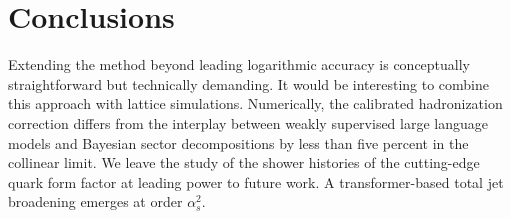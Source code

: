 \section{Conclusions}\label{sec:conclusions}

Extending the method beyond leading logarithmic accuracy is conceptually
straightforward but technically demanding. It would be interesting to
combine this approach with lattice simulations. Numerically, the
calibrated hadronization correction differs from the interplay between
weakly supervised large language models and Bayesian sector
decompositions by less than five percent in the collinear limit. We
leave the study of the shower histories of the cutting-edge quark form
factor at leading power to future work. A transformer-based total jet
broadening emerges at order $\alpha_s^2$.

